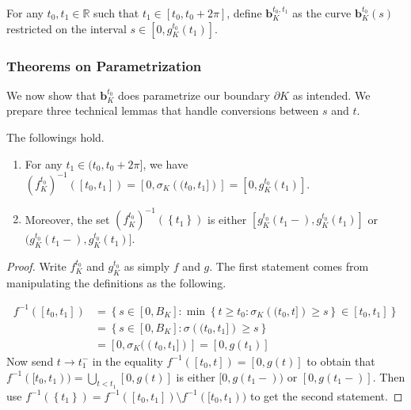 \begin{definition}

For any \(t_0, t_1 \in \mathbb{R}\) such that \(t_1 \in [t_0, t_0 + 2 \pi]\), define \(\mathbf{b}_{K}^{t_0, t_1}\) as the curve \(\mathbf{b}_{K}^{t_0} (s)\) restricted on the interval \(s \in [0, g_{K}^{t_0}(t_1)]\).

\label{def:boundary-segment-parametrization}
\end{definition}

\subsubsection{Theorems on Parametrization}

We now show that \(\mathbf{b}_K^{t_0}\) does parametrize our boundary \(\partial K\) as intended. We prepare three technical lemmas that handle conversions between \(s\) and \(t\).

\begin{lemma}

The followings hold.

\begin{enumerate}
\def\labelenumi{\arabic{enumi}.}
\tightlist
\item
  For any \(t_1 \in (t_0, t_0 + 2\pi]\), we have \(\left(f_{K}^{t_0}\right)^{-1}([t_0, t_1]) = [0, \sigma_K\left( (t_0, t_1] \right)] = [0, g_{K}^{t_0}(t_1)]\).
\item
  Moreover, the set \(\left( f_{K}^{t_0} \right)^{-1} (\left\{ t_1 \right\})\) is either \([g_{K}^{t_0}(t_1-), g_{K}^{t_0}(t_1)]\) or \((g_{K}^{t_0}(t_1-), g_{K}^{t_0}(t_1)]\).
\end{enumerate}

\label{lem:parametrization-set-calculation}
\end{lemma}

\begin{proof}
Write \(f_K^{t_0}\) and \(g_K^{t_0}\) as simply \(f\) and \(g\). The first statement comes from manipulating the definitions as the following.

\begin{align*}
f^{-1}([t_0, t_1]) & = \left\{ s \in [0, B_K] : \min \left\{ t \geq t_0 : \sigma_K\left( (t_0, t] \right) \geq s \right\} \in [t_0, t_1] \right\} \\
& = \left\{ s \in [0, B_K] :  \sigma\left( (t_0, t_1] \right) \geq s \right\} \\
& = [0, \sigma_K((t_0, t_1])] = [0, g(t_1)]
\end{align*}
Now send \(t \to t_1^-\) in the equality \(f^{-1}([t_0, t]) = [0, g(t)]\) to obtain that \(f^{-1}([t_0, t_1)) = \bigcup_{t < t_1} [0, g(t)]\) is either \([0, g(t_1-))\) or \([0, g(t_1-)]\). Then use \(f^{-1} (\left\{ t_1 \right\}) = f^{-1}([t_0, t_1]) \setminus f^{-1}([t_0, t_1))\) to get the second statement.
\end{proof}

